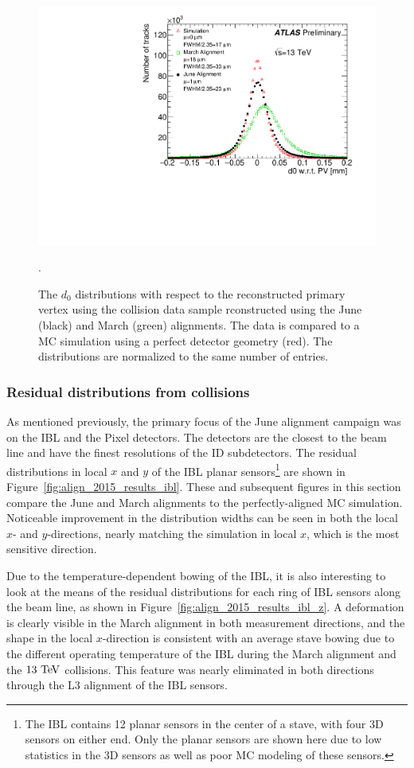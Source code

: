 \begin{figure}[htbp]
  \centering
  \includegraphics[width=.48\textwidth]{figs/alignment/align2015/d0_pvcorr}
  \caption{The $d_0$ distributions with respect to the reconstructed primary vertex using the  collision data sample rconstructed using the June (black) and March (green) alignments.  The data is compared to a MC simulation using a perfect detector geometry (red).  The distributions are normalized to the same number of entries.}
  \label{fig:align_2015_results_d0}.
\end{figure}

\subsubsection{Residual distributions from collisions}\label{align:2015_results_residual}
As mentioned previously, the primary focus of the June alignment campaign was on the IBL and the Pixel detectors.
The detectors are the closest to the beam line and have the finest resolutions of the ID subdetectors.
The residual distributions in local $x$ and $y$ of the IBL planar sensors\footnote{The IBL contains 12 planar sensors in the center of a stave, with four 3D sensors on either end.  Only the planar sensors are shown here due to low statistics in the 3D sensors as well as poor MC modeling of these sensors.} are shown in Figure~\ref{fig:align_2015_results_ibl}.
These and subsequent figures in this section compare the June and March alignments to the perfectly-aligned MC simulation.
Noticeable improvement in the distribution widths can be seen in both the local $x$- and $y$-directions, nearly matching the simulation in local $x$, which is the most sensitive direction.

Due to the temperature-dependent bowing of the IBL, it is also interesting to look at the means of the residual distributions for each ring of IBL sensors along the beam line, as shown in Figure~\ref{fig:align_2015_results_ibl_z}.
A deformation is clearly visible in the March alignment in both measurement directions, and the shape in the local $x$-direction is consistent with an average stave bowing due to the different operating temperature of the IBL during the March alignment and the $13\tev$ collisions.
This feature was nearly eliminated in both directions through the L3 alignment of the IBL sensors.

